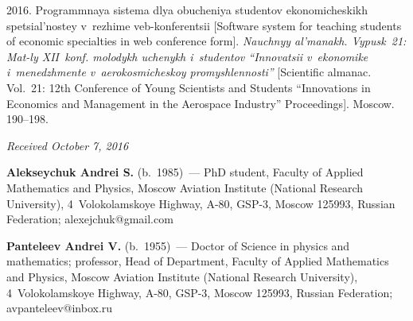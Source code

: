 \begin{multicols}{2}
{{\begin{thebibliography}{9}
 2016. Programmnaya sistema dlya obucheniya 
studentov ekonomicheskikh spetsial'nostey v~rezhime veb-konferentsii [Software 
system for teaching students of economic specialties in web conference form]. 
\textit{Nauchnyy al'manakh. Vypusk~21: Mat-ly XII~konf. molodykh uchenykh 
i~studentov ``Innovatsii v~ekonomike i~menedzhmente v~aerokosmicheskoy 
promyshlennosti''} [Scientific almanac. Vol.~21: 12th Conference of Young 
Scientists and Students ``Innovations in Economics and Management in the 
Aerospace Industry'' Proceedings]. Moscow. 190--198.
\end{thebibliography}

 }
 }

\end{multicols}

\vspace*{-3pt}

\hfill{\small\textit{Received October 7, 2016}}
  
  \Contr
  
  \noindent
  \textbf{Alekseychuk Andrei S.} (b.\ 1985)~--- PhD student, Faculty of Applied Mathematics 
and Physics, Moscow Aviation Institute (National Research University), 4~Volokolamskoye 
Highway, A-80, GSP-3, Moscow 125993, Russian Federation; \mbox{alexejchuk@gmail.com}
  
  \vspace*{3pt}
  
  \noindent
  \textbf{Panteleev Andrei V.} (b.\ 1955)~--- Doctor of Science in physics and mathematics; 
professor, Head of Department, Faculty of Applied Mathematics and Physics, Moscow Aviation 
Institute (National Research University), 4~Volokolamskoye Highway, A-80, GSP-3, Moscow 
125993, Russian Federation; \mbox{avpanteleev@inbox.ru}
  
\label{end\stat}


\renewcommand{\bibname}{\protect\rm Литература} 
  